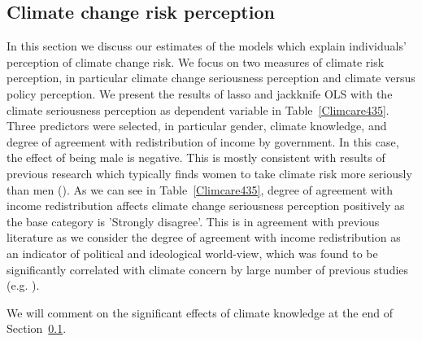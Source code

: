 \documentclass[a4paper,12pt]{article}
\begin{document}
\pagebreak





\subsection{Climate change risk perception}\label{ResPerc}

In this section we discuss our estimates of the models which explain individuals' perception of climate change risk. We focus on two measures of climate risk perception, in particular climate change seriousness perception and climate versus policy perception. We present the results of lasso and jackknife OLS with the climate seriousness perception as dependent variable in Table~\ref{Climcare435}. Three predictors were selected, in particular gender, climate knowledge, and degree of agreement with redistribution of income by government. In this case, the effect of being male is negative. This is mostly consistent with results of previous research which typically finds women to take climate risk more seriously than men (\citealp{WHITMARSH2011, McCright2010, Kahan2007}). As we can see in Table~\ref{Climcare435}, degree of agreement with income redistribution affects climate change seriousness perception positively as the base category is 'Strongly disagree'. This is in agreement with previous literature as we consider the degree of agreement with income redistribution as an indicator of political and ideological world-view, which was found to be significantly correlated with climate concern by large number of previous studies (e.g. \citealp{Leiserowitz2013, Kahan2012, WHITMARSH2011}). 

We will comment on the significant effects of climate knowledge at the end of Section~\ref{ResPerc}.
\end{document}

